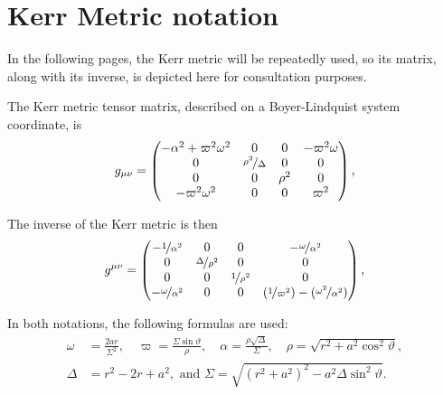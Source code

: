 \section{Kerr Metric notation}

In the following pages, the Kerr metric will be repeatedly used, so its matrix, along with its inverse, is depicted here for consultation purposes.

The Kerr metric tensor matrix, described on a Boyer-Lindquist system coordinate, is
\[
	g_{\mu\nu} = \begin{pmatrix}
		-\alpha^2 + \varpi^2\omega^2 & 0 & 0 & -\varpi^2\omega \\
		0 & \nicefrac{\rho^2}{\Delta} & 0 & 0 \\
		0 & 0 & \rho^2 & 0 \\
		-\varpi^2\omega^2 & 0 & 0 & \varpi^2
	\end{pmatrix},
\]

The inverse of the Kerr metric is then
\[
	g^{\mu\nu} = \begin{pmatrix}
		-\nicefrac{1}{\alpha^2} & 0 & 0 & -\nicefrac{\omega}{\alpha^2} \\
		0 & \nicefrac{\Delta}{\rho^2} & 0 & 0 \\
		0 & 0 & \nicefrac{1}{\rho^2} & 0 \\
		-\nicefrac{\omega}{\alpha^2} & 0 & 0 & (\nicefrac{1}{\varpi^2}) - (\nicefrac{\omega^2}{\alpha^2})
	\end{pmatrix},
\]


In both notations, the following formulas are used:
\begin{align}
	\omega &= \frac{2ar}{\Sigma^2},  \quad \varpi = \frac{\Sigma\sin\vartheta}{\rho}, \quad \alpha = \frac{\rho\sqrt{\Delta}}{\Sigma}, \quad \rho = \sqrt{r^2 + a^2\cos^2\vartheta},\nonumber\\
	\Delta &= r^2 - 2r + a^2, \textrm{ and } \Sigma = \sqrt{(r^2+a^2)^2 - a^2\Delta\sin^2\vartheta}.
	\label{eq:termdef}
\end{align}